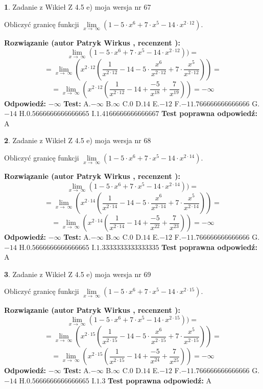 \documentclass[12pt, a4paper]{article}
\theoremstyle{definition} %
\newtheorem{zad}{}
\newcommand{\zadStart}[1]{\begin{zad}#1\newline}
\newcommand{\zadStop}{\end{zad}}
\newcommand{\rozwStart}[2]{\noindent \textbf{Rozwiązanie (autor #1 , recenzent #2): }\newline}
\newcommand{\rozwStop}{\newline}
\newcommand{\odpStart}{\noindent \textbf{Odpowiedź:}\newline}
\newcommand{\odpStop}{\newline}
\newcommand{\testStart}{\noindent \textbf{Test:}\newline}
\newcommand{\testStop}{\newline}
\newcommand{\kluczStart}{\noindent \textbf{Test poprawna odpowiedź:}\newline}
\newcommand{\kluczStop}{\newline}
\begin{document}
\zadStart{Zadanie z Wikieł Z 4.5 e) moja wersja nr 67}


Obliczyć granicę funkcji  $\lim\limits_{x\to\ \infty}(1 - 5 \cdot x^{6}+7 \cdot x^{5}- 14 \cdot x^{2\cdot12})$.
\zadStop
\rozwStart{Patryk Wirkus}{}
$$\lim\limits_{x\to\ \infty}(1 - 5 \cdot x^{6}+7 \cdot x^{5}- 14 \cdot x^{2\cdot12}))=$$
$$=\lim\limits_{x\to\ \infty}(x^{2\cdot12}(\frac{1}{x^{2\cdot12}}-14 -5 \cdot \frac{x^{6}}{x^{2\cdot12}}+7 \cdot \frac{x^{5}}{x^{2\cdot12}}))=$$
$$=\lim\limits_{x\to\ \infty}(x^{2\cdot12}(\frac{1}{x^{2\cdot12}}-14 + \frac{-5}{x^{18}}+ \frac{7}{x^{19}}))=-\infty$$
\rozwStop
\odpStart
$-\infty$
\odpStop
\testStart
A.$-\infty$ B.$\infty$ C.$0$ D.$14$ E.$-12$
F.$-11.766666666666666$ G.$-14$
H.$0.5666666666666665$
I.$1.4166666666666667$
\testStop
\kluczStart
A
\kluczStop



\zadStart{Zadanie z Wikieł Z 4.5 e) moja wersja nr 68}


Obliczyć granicę funkcji  $\lim\limits_{x\to\ \infty}(1 - 5 \cdot x^{6}+7 \cdot x^{5}- 14 \cdot x^{2\cdot14})$.
\zadStop
\rozwStart{Patryk Wirkus}{}
$$\lim\limits_{x\to\ \infty}(1 - 5 \cdot x^{6}+7 \cdot x^{5}- 14 \cdot x^{2\cdot14}))=$$
$$=\lim\limits_{x\to\ \infty}(x^{2\cdot14}(\frac{1}{x^{2\cdot14}}-14 -5 \cdot \frac{x^{6}}{x^{2\cdot14}}+7 \cdot \frac{x^{5}}{x^{2\cdot14}}))=$$
$$=\lim\limits_{x\to\ \infty}(x^{2\cdot14}(\frac{1}{x^{2\cdot14}}-14 + \frac{-5}{x^{22}}+ \frac{7}{x^{23}}))=-\infty$$
\rozwStop
\odpStart
$-\infty$
\odpStop
\testStart
A.$-\infty$ B.$\infty$ C.$0$ D.$14$ E.$-12$
F.$-11.766666666666666$ G.$-14$
H.$0.5666666666666665$
I.$1.3333333333333335$
\testStop
\kluczStart
A
\kluczStop



\zadStart{Zadanie z Wikieł Z 4.5 e) moja wersja nr 69}


Obliczyć granicę funkcji  $\lim\limits_{x\to\ \infty}(1 - 5 \cdot x^{6}+7 \cdot x^{5}- 14 \cdot x^{2\cdot15})$.
\zadStop
\rozwStart{Patryk Wirkus}{}
$$\lim\limits_{x\to\ \infty}(1 - 5 \cdot x^{6}+7 \cdot x^{5}- 14 \cdot x^{2\cdot15}))=$$
$$=\lim\limits_{x\to\ \infty}(x^{2\cdot15}(\frac{1}{x^{2\cdot15}}-14 -5 \cdot \frac{x^{6}}{x^{2\cdot15}}+7 \cdot \frac{x^{5}}{x^{2\cdot15}}))=$$
$$=\lim\limits_{x\to\ \infty}(x^{2\cdot15}(\frac{1}{x^{2\cdot15}}-14 + \frac{-5}{x^{24}}+ \frac{7}{x^{25}}))=-\infty$$
\rozwStop
\odpStart
$-\infty$
\odpStop
\testStart
A.$-\infty$ B.$\infty$ C.$0$ D.$14$ E.$-12$
F.$-11.766666666666666$ G.$-14$
H.$0.5666666666666665$
I.$1.3$
\testStop
\kluczStart
A
\kluczStop
\end{document}
